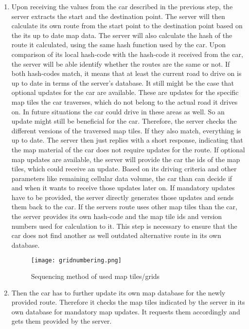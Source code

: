 \begin{enumerate}
\item Upon receiving the values from the car described in the previous step, the server extracts the start and the destination point. The server will then calculate its own route from the start point to the destination point based on the its up to date map data. The server will also calculate the hash of the route it calculated, using the same hash function used by the car. Upon comparison of its local hash-code with the hash-code it received from the car, the server will be able identify whether the routes are the same or not. If both hash-codes match, it means that at least the current road to drive on is up to date in terms of the server's database. It still might be the case that optional updates for the car are available. These are updates for the specific map tiles the car traverses, which do not belong to the actual road it drives on. In future situations the car could drive in these areas as well. So an update might still be beneficial for the car. Therefore, the server checks the different versions of the traversed map tiles. If they also match, everything is up to date. The server then just replies with a short response, indicating that the map material of the car does not require updates for the route. If optional map updates are available, the server will provide the car the ids of the map tiles, which could receive an update. Based on its driving criteria and other parameters like remaining cellular data volume, the car than can decide if and when it wants to receive those updates later on. If mandatory updates have to be provided, the server directly generates those updates and sends them back to the car. If the servers route uses other map tiles than the car, the server provides its own hash-code and the map tile ids and version numbers used for calculation to it. This step is necessary to ensure that the car does not find another as well outdated alternative route in its own database. 


\begin{figure}
\centering
\texttt{[image: gridnumbering.png]}
\label{fg:numbering}
\caption{Sequencing method of used map tiles/grids}
\end{figure}




\item Then the car has to further update its own map database for the newly provided route. Therefore it checks the map tiles indicated by the server in its own database for mandatory map updates. It requests them accordingly and gets them provided by the server.


\end{enumerate}
